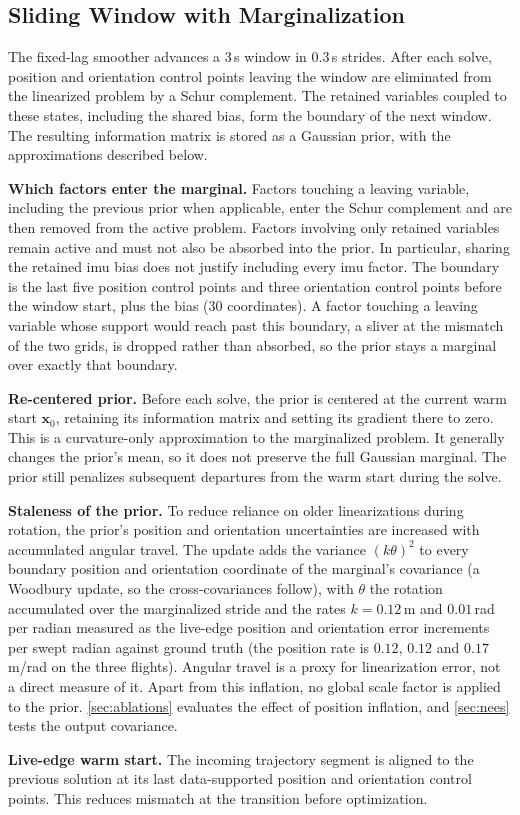 \subsection{Sliding Window with Marginalization}
\label{sec:sw}

The fixed-lag smoother advances a 3\,s window in 0.3\,s strides.
After each solve, position and orientation control points leaving the
window are eliminated from the linearized problem by a Schur
complement.  The retained variables coupled to these states, including
the shared bias, form the boundary of the next window.  The resulting
information matrix is stored as a Gaussian prior, with the
approximations described below.

\textbf{Which factors enter the marginal.}
Factors touching a leaving variable, including the previous prior
when applicable, enter the Schur complement and are then removed from
the active problem.  Factors involving only retained variables remain
active and must not also be absorbed into the prior.  In particular,
sharing the retained \ac{imu} bias does not justify including every
\ac{imu} factor.  The boundary is the last five position control points and three
orientation control points before the window start, plus the bias (30
coordinates).  A factor touching a leaving variable whose support
would reach past this boundary, a sliver at the mismatch of the two
grids, is dropped rather than absorbed, so the prior stays a marginal
over exactly that boundary.

\textbf{Re-centered prior.}
Before each solve, the prior is centered at the current warm start
$\mathbf{x}_0$, retaining its information matrix and setting its
gradient there to zero.  This is a curvature-only approximation to
the marginalized problem.  It generally changes the prior's mean,
so it does not preserve the full Gaussian marginal.  The prior still
penalizes subsequent departures from the warm start during the solve.

\textbf{Staleness of the prior.}
To reduce reliance on older linearizations during rotation, the
prior's position and orientation uncertainties are increased with
accumulated angular travel.  The update adds the variance $(k\theta)^2$ to every boundary position
and orientation coordinate of the marginal's covariance (a Woodbury
update, so the cross-covariances follow), with $\theta$ the rotation
accumulated over the marginalized stride and the rates $k = 0.12$\,m
and $0.01$\,rad per radian measured as the live-edge position and
orientation error increments per swept radian against ground truth
(the position rate is $0.12$, $0.12$ and $0.17$\,m/rad on the three
flights).  Angular travel is a proxy for linearization error, not a
direct measure of it.
Apart from this inflation, no global scale factor is applied to the
prior.  \autoref{sec:ablations} evaluates the effect of position
inflation, and \autoref{sec:nees} tests the output covariance.

\textbf{Live-edge warm start.}
The incoming trajectory segment is aligned to the previous solution
at its last data-supported position and orientation control points.  This
reduces mismatch at the transition before optimization.

